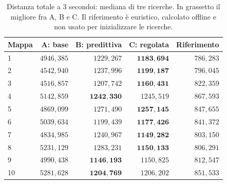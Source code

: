 \begin{table}[!htbp]
\centering\small
\caption{Distanza totale a 3 secondoi: mediana di tre ricerche. In grassetto il migliore fra A, B e C. Il riferimento è euristico, calcolato offline e non usato per inizializzare le ricerche.}\label{tab:costs3}
\begin{tabular}{lrrrr}
\toprule
Mappa & A: base & B: predittiva & C: regolata & Riferimento\\
\midrule
1 & $4946{,}385$ & $1229{,}267$ & $\mathbf{1183{,}694}$ & $786{,}283$\\
2 & $4542{,}940$ & $1237{,}996$ & $\mathbf{1199{,}187}$ & $796{,}045$\\
3 & $4516{,}857$ & $1207{,}742$ & $\mathbf{1160{,}431}$ & $822{,}359$\\
4 & $5142{,}859$ & $\mathbf{1242{,}330}$ & $1245{,}519$ & $867{,}593$\\
5 & $4869{,}099$ & $1271{,}490$ & $\mathbf{1257{,}145}$ & $847{,}655$\\
6 & $5039{,}634$ & $1199{,}439$ & $\mathbf{1177{,}426}$ & $841{,}372$\\
7 & $4834{,}985$ & $1240{,}967$ & $\mathbf{1149{,}282}$ & $803{,}150$\\
8 & $5231{,}129$ & $1283{,}231$ & $\mathbf{1150{,}133}$ & $806{,}291$\\
9 & $4990{,}438$ & $\mathbf{1146{,}193}$ & $1150{,}825$ & $812{,}547$\\
10 & $5281{,}628$ & $\mathbf{1204{,}769}$ & $1206{,}202$ & $851{,}533$\\
\bottomrule
\end{tabular}
\end{table}
